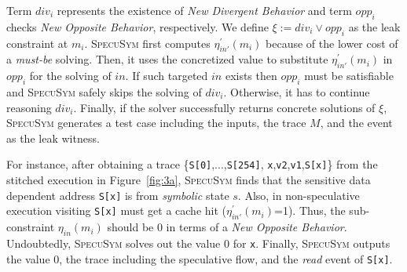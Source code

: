 \documentclass[sigconf]{acmart}
\newcommand\ignore[1]{}
\newcommand{\SpecuSym}{\textsc{SpecuSym} }
\begin{document}
\ignore{
%
\begin{multline}
  \label{eqn:leak}
  ~~
  \xi:=
  \Big(
  \mathit{div_i}
  \wedge
  \big(
  \sum_{\scriptscriptstyle \mathit{k=0}}^{\scriptscriptstyle\mathit{n}} 
  \mathit{\eta_{in''}(m_k)=}0
  \neq
  \sum_{\scriptscriptstyle \mathit{k=0}}^{\scriptscriptstyle\mathit{n}} 
  \mathit{\eta_{in''}(m_k)=}1
  \big)
  \Big)
  \vee 
  \mathit{opp_i}
  ~~
\end{multline}
%
}

\ignore{
Note that 
speculative execution not only evicts cache lines to cause new misses but also loads 
memory data into cache that benefits new hits. Since a leak refers to the noticeable 
timing variance in program runs with and without speculative execution, from 
$\mathit{opp_i}$ the amount of new misses should differ from the amount of new hits. 
And we construct the final leak constraint $\xi$ on this observation:
}


Term $\mathit{div_i}$ represents the existence of \textit{New Divergent Behavior} 
and term $\mathit{opp_i}$ checks \textit{New Opposite Behavior}, respectively. We 
define $\xi:=\mathit{div_i}\vee\mathit{opp_i}$ as the leak constraint at $\mathit{m_i}$.
\SpecuSym first computes $\mathit{\eta_{in'}^\prime(m_i)}$ because of the lower cost 
of a \textit{must-be} solving. Then, it uses the concretized value to substitute
$\mathit{\eta_{in'}^\prime(m_i)}$ in $\mathit{opp_i}$ for the solving of $\mathit{in}$. 
If such targeted $\mathit{in}$ exists then $opp_i$ must be satisfiable and \SpecuSym
safely skips the solving of $\mathit{div_i}$. Otherwise, it has to continue reasoning 
$\mathit{div_i}$. Finally, if the solver successfully returns concrete solutions
of $\xi$, \SpecuSym generates a test case including the inputs, the trace $M$, and 
the event as the leak witness.


For instance, after obtaining a trace {\small \{\texttt{S[0]},...,\texttt{S[254]},
\texttt{x},\texttt{v2},\texttt{v1},\texttt{S[x]}\}} from the stitched execution 
in Figure~\ref{fig:3a}, \SpecuSym finds that the sensitive data dependent 
address {\small\texttt{S[x]}} is from \textit{symbolic} state $s$. Also, 
in non-speculative execution visiting {\small\texttt{S[x]}} must get a cache hit 
($\mathit{\eta_{in'}^\prime(m_i)}$=1). Thus, the sub-constraint $\mathit{\eta_{in}(m_i)}$ 
should be 0 in terms of a \textit{New Opposite Behavior}. Undoubtedly, \SpecuSym solves 
out the value 0 for {\small\texttt{x}}. Finally, \SpecuSym outputs the value 0, the 
trace including the speculative flow, and the \textit{read} event of {\small\texttt{S[x]}}.
\end{document}
